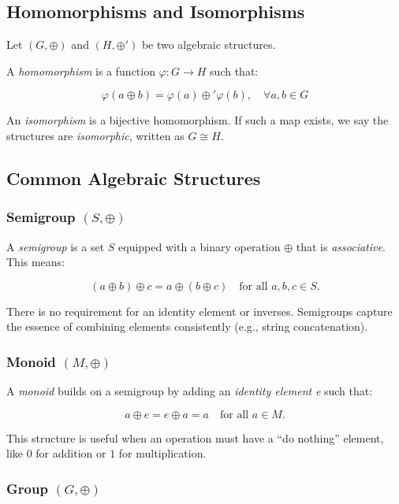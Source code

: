 \subsection{Homomorphisms and Isomorphisms}

Let \((G, \oplus)\) and \((H, \oplus')\) be two algebraic structures.
\vspace{\baselineskip}

A \emph{homomorphism} is a function \(\varphi: G \rightarrow H\) such that:
    
\[
  \varphi(a \oplus b) = \varphi(a) \oplus' \varphi(b), \quad \forall a,b \in G
\]
    
An \emph{isomorphism} is a bijective homomorphism. If such a map exists, we say the structures are \emph{isomorphic}, written as \(G \cong H\).

\subsection{Common Algebraic Structures}

\subsubsection{Semigroup \texorpdfstring{\((S, \oplus)\)}{}}

A \emph{semigroup} is a set \(S\) equipped with a binary operation \(\oplus\) that is \emph{associative}. This means:

\[
  (a \oplus b) \oplus c = a \oplus (b \oplus c) \quad \text{for all } a, b, c \in S.
\]

There is no requirement for an identity element or inverses. Semigroups 
capture the essence of combining elements consistently (e.g., string concatenation).

\subsubsection{Monoid \texorpdfstring{\((M, \oplus)\)}{}}

A \emph{monoid} builds on a semigroup by adding an \emph{identity element} \emph{e} such that:

\[
  a \oplus e = e \oplus a = a \quad \text{for all } a \in M.
\]

This structure is useful when an operation must have a “do nothing” element, like \(0\) for addition or \(1\) for multiplication.

\subsubsection{Group \texorpdfstring{\((G, \oplus)\)}{}}

